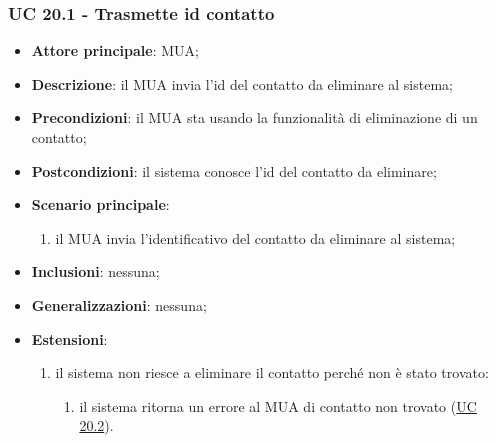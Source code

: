 \subsubsection{UC 20.1 - Trasmette id contatto} \label{sec:UC20.1}
    \begin{itemize}
        \item \textbf{Attore principale}: MUA;
        \item \textbf{Descrizione}:  il MUA invia l'id del contatto da eliminare al sistema;
        \item \textbf{Precondizioni}: il MUA sta usando la funzionalità di eliminazione di un contatto;
        \item \textbf{Postcondizioni}:  il sistema conosce l'id del contatto da eliminare;
        \item \textbf{Scenario principale}:
            \begin{enumerate}
                \item il MUA invia l'identificativo del contatto da eliminare al sistema;
            \end{enumerate}
        \item \textbf{Inclusioni}: nessuna;
        \item \textbf{Generalizzazioni}: nessuna;
        \item \textbf{Estensioni}:
            \begin{enumerate}[label=\alph*.]
                \item il sistema non riesce a eliminare il contatto perché non è stato trovato:
                \begin{enumerate}[label=\arabic*.]
                    \item il sistema ritorna un errore al MUA di contatto non trovato (\hyperref[sec:UC20.2]{UC 20.2}).
                \end{enumerate}
            \end{enumerate}
    \end{itemize}



